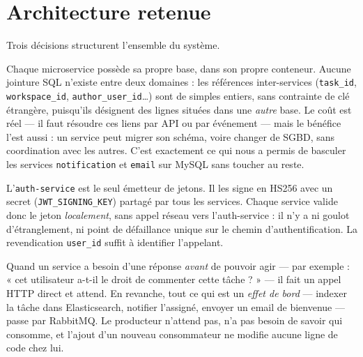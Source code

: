 \documentclass[11pt,a4paper,oneside]{report}
\newcommand{\code}[1]{\texttt{\small #1}}
\begin{document}
\section{Architecture retenue}

Trois décisions structurent l'ensemble du système.

\begin{choix}
Chaque microservice possède sa propre base, dans son propre conteneur. Aucune
jointure SQL n'existe entre deux domaines : les références inter-services
(\code{task\_id}, \code{workspace\_id}, \code{author\_user\_id}\ldots) sont de
simples entiers, sans contrainte de clé étrangère, puisqu'ils désignent des
lignes situées dans une \emph{autre} base. Le coût est réel — il faut résoudre
ces liens par API ou par événement — mais le bénéfice l'est aussi : un service
peut migrer son schéma, voire changer de SGBD, sans coordination avec les
autres. C'est exactement ce qui nous a permis de basculer les services
\code{notification} et \code{email} sur MySQL sans toucher au reste.
\end{choix}

\begin{choix}
L'\code{auth-service} est le seul émetteur de jetons. Il les signe en HS256
avec un secret (\code{JWT\_SIGNING\_KEY}) partagé par tous les services. Chaque
service valide donc le jeton \emph{localement}, sans appel réseau vers
l'auth-service : il n'y a ni goulot d'étranglement, ni point de défaillance
unique sur le chemin d'authentification. La revendication \code{user\_id}
suffit à identifier l'appelant.
\end{choix}

\begin{choix}
Quand un service a besoin d'une réponse \emph{avant} de pouvoir agir — par
exemple : « cet utilisateur a-t-il le droit de commenter cette tâche ? » — il
fait un appel HTTP direct et attend. En revanche, tout ce qui est un
\emph{effet de bord} — indexer la tâche dans Elasticsearch, notifier l'assigné,
envoyer un email de bienvenue — passe par RabbitMQ. Le producteur n'attend pas,
n'a pas besoin de savoir qui consomme, et l'ajout d'un nouveau consommateur ne
modifie aucune ligne de code chez lui.
\end{choix}

\end{document}
